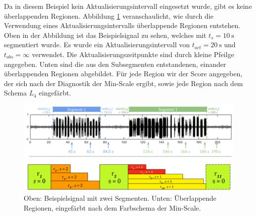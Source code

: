 Da in diesem Beispiel kein Aktualisierungsintervall eingesetzt wurde, gibt es keine überlappenden Regionen. Abbildung \ref{fig:viz_multiple_regions} veranschaulicht, wie durch die Verwendung eines Aktualisierungsintervalls überlappende Regionen entstehen. Oben in der Abbildung ist das Beispielsignal zu sehen, welches mit $t_s = \SI{10}{\second}$ segmentiert wurde. Es wurde ein Aktualisierungsintervall von  $t_{act} = \SI{20}{\second}$ und $t_{obs} = \infty$ verwendet. Die Aktualisierungszeitpunkte sind durch kleine Pfeilge angegeben. Unten sind die aus den Subsegmenten entstandenen, einander überlappenden Regionen abgebildet. Für jede Region wir der Score angegeben, der sich nach der Diagnostik der Min-Scale ergibt, sowie jede Region nach dem Schema $L_4$ eingefärbt.

\begin{figure}[h]
	\centering
	\includegraphics[width=1\textwidth]{bilder/viz-multiple-regions.png}
	\caption{Oben: Beispielsignal mit zwei Segmenten. Unten: Überlappende Regionen, eingefärbt nach dem Farbschema der Min-Scale.}
	\label{fig:viz_multiple_regions}
\end{figure}

